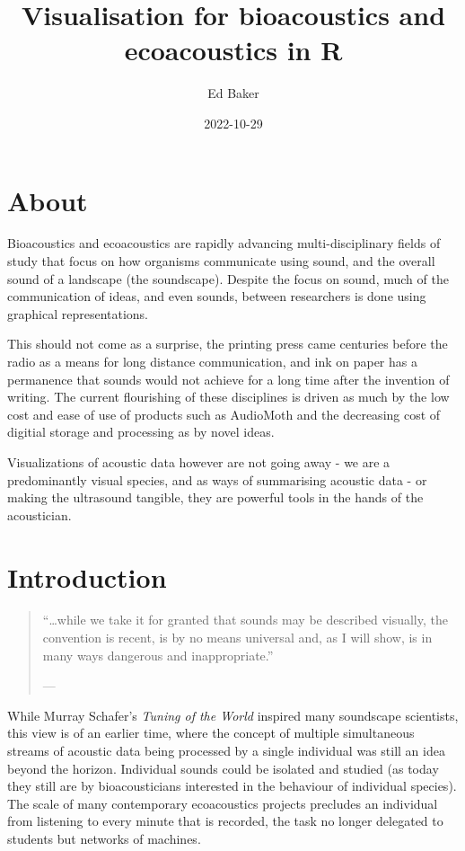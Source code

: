 \documentclass[
]{book}
\title{Visualisation for bioacoustics and ecoacoustics in R}
\author{Ed Baker}
\date{2022-10-29}
\begin{document}
\maketitle

{
\setcounter{tocdepth}{1}
\tableofcontents
}
\hypertarget{about}{%
\chapter*{About}\label{about}}

Bioacoustics and ecoacoustics are rapidly advancing multi-disciplinary fields of study that focus on how organisms communicate using sound, and the overall sound of a landscape (the soundscape). Despite the focus on sound, much of the communication of ideas, and even sounds, between researchers is done using graphical representations.

This should not come as a surprise, the printing press came centuries before the radio as a means for long distance communication, and ink on paper has a permanence that sounds would not achieve for a long time after the invention of writing. The current flourishing of these disciplines is driven as much by the low cost and ease of use of products such as AudioMoth and the decreasing cost of digitial storage and processing as by novel ideas.

Visualizations of acoustic data however are not going away - we are a predominantly visual species, and as ways of summarising acoustic data - or making the ultrasound tangible, they are powerful tools in the hands of the acoustician.

\hypertarget{intro}{%
\chapter{Introduction}\label{intro}}

\begin{quote}
``\ldots while we take it for granted that sounds may be described visually, the convention is recent, is by no means universal and, as I will show, is in many ways dangerous and inappropriate.''

\hfill --- \citet{schafer1977}
\end{quote}

While Murray Schafer's \emph{Tuning of the World} \citep{schafer1977} inspired many soundscape scientists, this view is of an earlier time, where the concept of multiple simultaneous streams of acoustic data being processed by a single individual was still an idea beyond the horizon. Individual sounds could be isolated and studied (as today they still are by bioacousticians interested in the behaviour of individual species). The scale of many contemporary ecoacoustics projects precludes an individual from listening to every minute that is recorded, the task no longer delegated to students but networks of machines.
\end{document}
